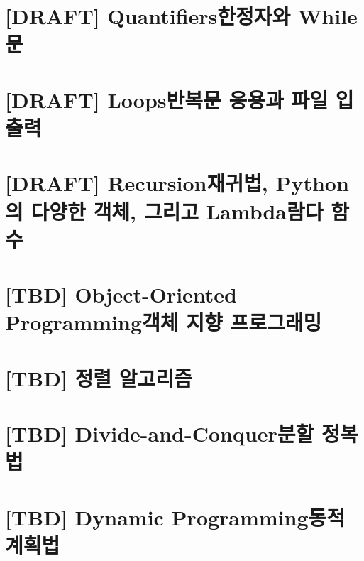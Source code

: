 \documentclass[a4paper, 10pt, twoside, calcwidth]{oblivoir}
\begin{document}


\section{[DRAFT] Quantifiers한정자와 While 문}



\section{[DRAFT] Loops반복문 응용과 파일 입출력}



% 

\section{[DRAFT] Recursion재귀법, Python의 다양한 객체, 그리고 Lambda람다 함수}


\section{[TBD] Object-Oriented Programming객체 지향 프로그래밍}

\section{[TBD] 정렬 알고리즘}

\section{[TBD] Divide-and-Conquer분할 정복법}

\section{[TBD] Dynamic Programming동적 계획법}
\end{document}
